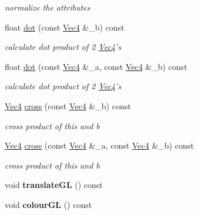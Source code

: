 \begin{DoxyCompactItemize}
\begin{DoxyCompactList}\small\item\em normalize the attributes \end{DoxyCompactList}\item 
\hypertarget{classVec4_ab8b986ec7a01e1799479eb78efce0400}{float \hyperlink{classVec4_ab8b986ec7a01e1799479eb78efce0400}{dot} (const \hyperlink{classVec4}{Vec4} \&\-\_\-b) const }\label{classVec4_ab8b986ec7a01e1799479eb78efce0400}

\begin{DoxyCompactList}\small\item\em calculate dot product of 2 \hyperlink{classVec4}{Vec4}'s \end{DoxyCompactList}\item 
\hypertarget{classVec4_a50c04fbd0dc31b35c90bf0327f25f493}{float \hyperlink{classVec4_a50c04fbd0dc31b35c90bf0327f25f493}{dot} (const \hyperlink{classVec4}{Vec4} \&\-\_\-a, const \hyperlink{classVec4}{Vec4} \&\-\_\-b) const }\label{classVec4_a50c04fbd0dc31b35c90bf0327f25f493}

\begin{DoxyCompactList}\small\item\em calculate dot product of 2 \hyperlink{classVec4}{Vec4}'s \end{DoxyCompactList}\item 
\hyperlink{classVec4}{Vec4} \hyperlink{classVec4_ad8c09b1c096d065e117ffac51462bb0f}{cross} (const \hyperlink{classVec4}{Vec4} \&\-\_\-b) const 
\begin{DoxyCompactList}\small\item\em cross product of this and b \end{DoxyCompactList}\item 
\hyperlink{classVec4}{Vec4} \hyperlink{classVec4_a5d37475d1a9b8ea514496826bf1eed8f}{cross} (const \hyperlink{classVec4}{Vec4} \&\-\_\-a, const \hyperlink{classVec4}{Vec4} \&\-\_\-b) const 
\begin{DoxyCompactList}\small\item\em cross product of this and b \end{DoxyCompactList}\item 
\hypertarget{classVec4_a7d08eb201ea4fd8d57bb0d8bb404e5ce}{void {\bfseries translate\-G\-L} () const }\label{classVec4_a7d08eb201ea4fd8d57bb0d8bb404e5ce}

\item 
\hypertarget{classVec4_ab6408ead37201958bbf4a9680b8d65a9}{void {\bfseries colour\-G\-L} () const }\label{classVec4_ab6408ead37201958bbf4a9680b8d65a9}


\end{DoxyCompactItemize}
